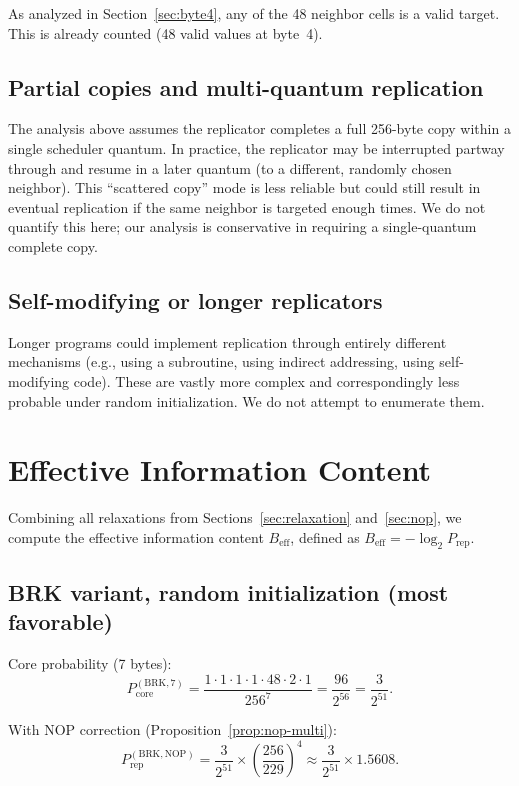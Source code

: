\documentclass{article}
\newcommand{\Beff}{B_{\mathrm{eff}}}
\newcommand{\Prep}{P_{\mathrm{rep}}}
\begin{document}
As analyzed in Section~\ref{sec:byte4}, any of the 48 neighbor cells
is a valid target. This is already counted (48 valid values at byte~4).

\subsection{Partial copies and multi-quantum replication}

The analysis above assumes the replicator completes a full 256-byte
copy within a single scheduler quantum. In practice, the replicator
may be interrupted partway through and resume in a later quantum (to a
different, randomly chosen neighbor). This ``scattered copy'' mode is
less reliable but could still result in eventual replication if the
same neighbor is targeted enough times. We do not quantify this here;
our analysis is conservative in requiring a single-quantum complete
copy.

\subsection{Self-modifying or longer replicators}

Longer programs could implement replication through entirely different
mechanisms (e.g., using a subroutine, using indirect addressing, using
self-modifying code). These are vastly more complex and correspondingly
less probable under random initialization. We do not attempt to
enumerate them.

\section{Effective Information Content}
\label{sec:beff}

Combining all relaxations from Sections~\ref{sec:relaxation}
and~\ref{sec:nop}, we compute the effective information content
$\Beff$, defined as $\Beff = -\log_2 \Prep$.

\subsection{BRK variant, random initialization (most favorable)}

Core probability (7 bytes):
\[
  P_{\mathrm{core}}^{(\mathrm{BRK,7})} = \frac{1 \cdot 1 \cdot 1 \cdot 1 \cdot 48 \cdot 2 \cdot 1}{256^7} = \frac{96}{2^{56}} = \frac{3}{2^{51}}.
\]

With NOP correction (Proposition~\ref{prop:nop-multi}):
\[
  \Prep^{(\mathrm{BRK,NOP})} = \frac{3}{2^{51}} \times \left(\frac{256}{229}\right)^4 \approx \frac{3}{2^{51}} \times 1.5608.
\]
\end{document}
